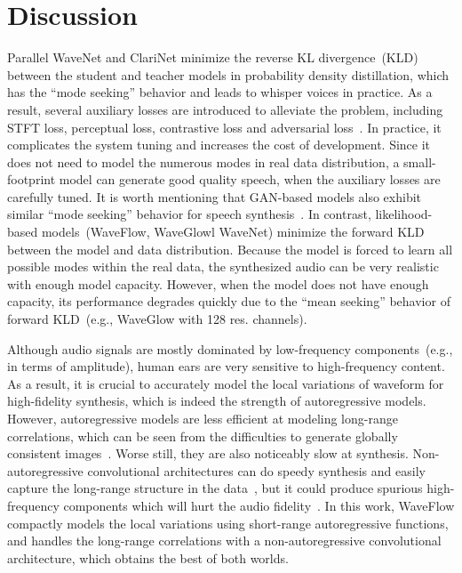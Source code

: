 \documentclass{article}
\begin{document}
\section{Discussion}
\label{sec:conclusion}
\vspace{-.1em}
Parallel WaveNet and ClariNet minimize the reverse KL divergence~(KLD) between the student and teacher models in probability density distillation, which has the ``mode seeking'' behavior and leads to whisper voices in practice. 
As a result, several auxiliary losses are introduced to alleviate the problem, including STFT loss, perceptual loss, contrastive loss and adversarial loss~\citep{oord2017parallel, ping2018clarinet, wang2019neural, yamamoto2019probability}. In practice, it complicates the system tuning and increases the cost of development.
Since it does not need to model the numerous modes in real data distribution, a small-footprint model can generate good quality speech, when the auxiliary losses are carefully tuned.
It is worth mentioning that GAN-based models also exhibit similar  ``mode seeking'' behavior for speech synthesis~\citep{kumar2019melgan, binkowski2019high, yamamoto2019parallel}. 
In contrast, likelihood-based models~(WaveFlow, WaveGlowl WaveNet) minimize the forward KLD between the model and data distribution.
Because the model is forced to learn all possible modes within the real data, the synthesized audio can be very realistic with enough model capacity. 
However, when the model does not have enough capacity, its performance degrades quickly due to the ``mean seeking'' behavior of forward KLD~(e.g., WaveGlow with 128 res. channels).


Although audio signals are mostly dominated by low-frequency components~(e.g., in terms of amplitude), human ears are very sensitive to high-frequency content.
As a result, it is crucial to accurately model the local variations of waveform for high-fidelity synthesis, which is indeed the strength of autoregressive models.
However, autoregressive models are less efficient at modeling long-range correlations, which can be seen from the difficulties to generate globally consistent images~\citep{van2016conditional, menick2018generating}. 
Worse still, they are also noticeably slow at synthesis.
Non-autoregressive convolutional architectures can do speedy synthesis and easily capture the long-range structure in the data~\citep{radford2015unsupervised, brock2018large}, but it could produce spurious high-frequency components which will hurt the audio fidelity~\citep[e.g.,][]{donahue2018adversarial}.
In this work, WaveFlow compactly models the local variations using short-range autoregressive functions, and handles the long-range correlations with a non-autoregressive convolutional architecture, which obtains the best of both worlds.
\end{document}
